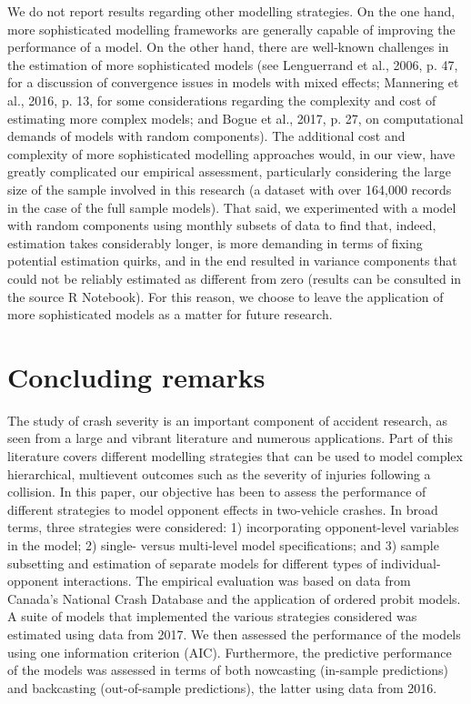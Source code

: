 \documentclass[]{elsarticle} %
\begin{document}
We do not report results regarding other modelling strategies. On the
one hand, more sophisticated modelling frameworks are generally capable
of improving the performance of a model. On the other hand, there are
well-known challenges in the estimation of more sophisticated models
(see Lenguerrand et al., 2006, p. 47, for a discussion of convergence
issues in models with mixed effects; Mannering et al., 2016, p. 13, for
some considerations regarding the complexity and cost of estimating more
complex models; and Bogue et al., 2017, p. 27, on computational demands
of models with random components). The additional cost and complexity of
more sophisticated modelling approaches would, in our view, have greatly
complicated our empirical assessment, particularly considering the large
size of the sample involved in this research (a dataset with over
164,000 records in the case of the full sample models). That said, we
experimented with a model with random components using monthly subsets
of data to find that, indeed, estimation takes considerably longer, is
more demanding in terms of fixing potential estimation quirks, and in
the end resulted in variance components that could not be reliably
estimated as different from zero (results can be consulted in the source
R Notebook). For this reason, we choose to leave the application of more
sophisticated models as a matter for future research.

\hypertarget{sec:concluding-remarks}{%
\section{Concluding remarks}\label{sec:concluding-remarks}}

The study of crash severity is an important component of accident
research, as seen from a large and vibrant literature and numerous
applications. Part of this literature covers different modelling
strategies that can be used to model complex hierarchical, multievent
outcomes such as the severity of injuries following a collision. In this
paper, our objective has been to assess the performance of different
strategies to model opponent effects in two-vehicle crashes. In broad
terms, three strategies were considered: 1) incorporating opponent-level
variables in the model; 2) single- versus multi-level model
specifications; and 3) sample subsetting and estimation of separate
models for different types of individual-opponent interactions. The
empirical evaluation was based on data from Canada's National Crash
Database and the application of ordered probit models. A suite of models
that implemented the various strategies considered was estimated using
data from 2017. We then assessed the performance of the models using one
information criterion (AIC). Furthermore, the predictive performance of
the models was assessed in terms of both nowcasting (in-sample
predictions) and backcasting (out-of-sample predictions), the latter
using data from 2016.
\end{document}
